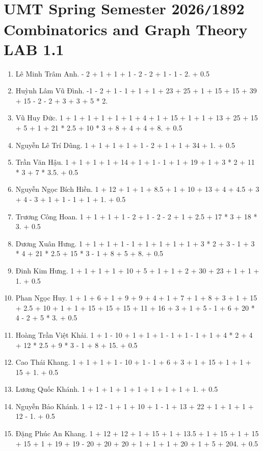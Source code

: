 \documentclass{article}
\begin{document}

\section{UMT Spring Semester 2026{\tt/}1892 Combinatorics and Graph Theory LAB 1.1}

\begin{enumerate}
	\item {\sc Lê Minh Trâm Anh.} - 2 + 1 + 1 + 1 - 2 - 2 + 1 - 1 - 2. + 0.5
	\item {\sc Huỳnh Lâm Vũ Đình.} -1 - 2 + 1 - 1 + 1 + 1 + 23 + 25 + 1 + 15 + 15 + 39 + 15 - 2 - 2 + 3 + 3 + 5 * 2.
	\item {\sc Vũ Huy Đức.} 1 + 1 + 1 + 1 + 1 + 1 + 4 + 1 + 15 + 1 + 1 + 13 + 25 + 15 + 5 + 1 + 21 * 2.5 + 10 * 3 + 8 + 4 + 4 + 8. + 0.5
	\item {\sc Nguyễn Lê Trí Dũng.}	1 + 1 + 1 + 1 + 1 - 2 + 1 + 1 + 34 + 1. + 0.5
	\item {\sc Trần Văn Hậu.} 1 + 1 + 1 + 1 + 14 + 1 + 1 - 1 + 1 + 19 + 1 + 3 * 2 + 11 * 3 + 7 * 3.5. + 0.5
	\item {\sc Nguyễn Ngọc Bích Hiền.} 1 + 12 + 1 + 1 + 8.5 + 1 + 10 + 13 + 4 + 4.5 + 3 + 4 - 3 + 1 + 1 - 1 + 1 + 1. + 0.5
	\item {\sc Trương Công Hoan.} 1 + 1 + 1 + 1 - 2 + 1 - 2 - 2 + 1 + 2.5 + 17 * 3 + 18 * 3. + 0.5
	\item {\sc Dương Xuân Hưng.} 1 + 1 + 1 + 1 - 1 + 1 + 1 + 1 + 1 + 3 * 2 + 3 - 1 + 3 * 4 + 21 * 2.5 + 15 * 3 - 1 + 8 + 5 + 8. + 0.5
	\item {\sc Đinh Kim Hưng.} 1 + 1 + 1 + 1 + 10 + 5 + 1 + 1 + 2 + 30 + 23 + 1 + 1 + 1. + 0.5
	\item {\sc Phan Ngọc Huy.} 1 + 1 + 6 + 1 + 9 + 9 + 4 + 1 + 7 + 1 + 8 + 3 + 1 + 15 + 2.5 + 10 + 1 + 1 + 15 + 15 + 15 + 11 + 16 + 3 + 1 + 5 - 1 + 6 + 20 * 4 - 2 + 5 * 3. + 0.5
	\item {\sc Hoàng Trần Việt Khải.} 1 + 1 - 10 + 1 + 1 + 1 - 1 + 1 - 1 + 1 + 4 * 2 + 4 + 12 * 2.5 + 9 * 3 - 1 + 8 + 15. + 0.5
	\item {\sc Cao Thái Khang.} 1 + 1 + 1 + 1 - 10 + 1 - 1 + 6 + 3 + 1 + 15 + 1 + 1 + 15 + 1. + 0.5
	\item {\sc Lương Quốc Khánh.} 1 + 1 + 1 + 1 + 1 + 1 + 1 + 1 + 1. + 0.5
	\item {\sc Nguyễn Bảo Khánh.} 1 + 12 - 1 + 1 + 10 + 1 - 1 + 13 + 22 + 1 + 1 + 1 + 12 - 1. + 0.5
	\item {\sc Đặng Phúc An Khang.}	1 + 12 + 12 + 1 + 15 + 1 + 13.5 + 1 + 15 + 1 + 15 + 15 + 1 + 19 + 19 - 20 + 20 + 20 + 1 + 1 + 1 + 20 + 1 + 5 + 204. + 0.5

\end{enumerate}
\end{document}
